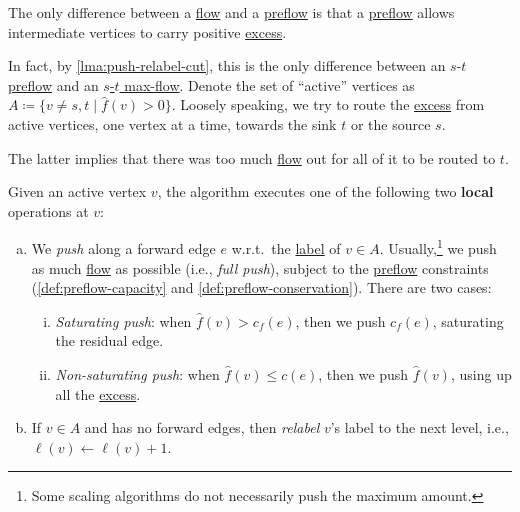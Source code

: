 \begin{prev}
	The only difference between a \hyperref[def:flow]{flow} and a \hyperref[def:preflow]{preflow} is that a \hyperref[def:preflow]{preflow} allows intermediate vertices to carry positive \hyperref[def:excess]{excess}.
\end{prev}

In fact, by \autoref{lma:push-relabel-cut}, this is the only difference between an \(s\)-\(t\) \hyperref[def:preflow]{preflow} and an \hyperref[prb:s-t-max-flow]{\(s\)-\(t\) max-flow}. Denote the set of ``active'' vertices as \(A \coloneqq \{ v \neq s, t \mid \hat{f} (v) > 0 \} \). Loosely speaking, we try to route the \hyperref[def:excess]{excess} from active vertices, one vertex at a time, towards the sink \(t\) or the source \(s\).

\begin{intuition}
	The latter implies that there was too much \hyperref[def:flow]{flow} out for all of it to be routed to \(t\).
\end{intuition}

Given an active vertex \(v\), the algorithm executes one of the following two \textbf{local} operations at \(v\):
\begin{enumerate}[(a)]
	\item\label{algo:push-relabel-push} We \emph{push} along a forward edge \(e\) w.r.t.\ the \hyperref[def:label]{label} of \(v \in A\). Usually,\footnote{Some scaling algorithms do not necessarily push the maximum amount.} we push as much \hyperref[def:flow]{flow} as possible (i.e., \emph{full push}), subject to the \hyperref[def:preflow]{preflow} constraints (\autoref{def:preflow-capacity} and \autoref{def:preflow-conservation}). There are two cases:
	      \begin{enumerate}[(i)]
		      \item\label{algo:push-relabel-push-saturating} \emph{Saturating push}: when \(\hat{f} (v) > c_f(e)\), then we push \(c_f(e)\), saturating the residual edge.
		      \item\label{algo:push-relabel-push-non-saturating} \emph{Non-saturating push}: when \(\hat{f} (v) \leq c(e)\), then we push \(\hat{f} (v)\), using up all the \hyperref[def:excess]{excess}.
	      \end{enumerate}
	\item\label{algo:push-relabel-relabel} If \(v \in A\) and has no forward edges, then \emph{relabel} \(v\)'s label to the next level, i.e., \(\ell (v) \gets \ell (v) + 1\).
\end{enumerate}

